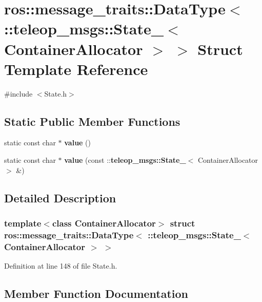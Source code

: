 \section{ros::message\_\-traits::DataType$<$ ::teleop\_\-msgs::State\_\-$<$ ContainerAllocator $>$ $>$ Struct Template Reference}
\label{structros_1_1message__traits_1_1DataType_3_01_1_1teleop__msgs_1_1State___3_01ContainerAllocator_01_4_01_4}


{\ttfamily \#include $<$State.h$>$}

\subsection*{Static Public Member Functions}
\begin{DoxyCompactItemize}
\item 
static const char $\ast$ {\bf value} ()
\item 
static const char $\ast$ {\bf value} (const ::{\bf teleop\_\-msgs::State\_\-}$<$ ContainerAllocator $>$ \&)
\end{DoxyCompactItemize}


\subsection{Detailed Description}
\subsubsection*{template$<$class ContainerAllocator$>$ struct ros::message\_\-traits::DataType$<$ ::teleop\_\-msgs::State\_\-$<$ ContainerAllocator $>$ $>$}



Definition at line 148 of file State.h.



\subsection{Member Function Documentation}
